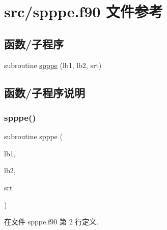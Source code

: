 \hypertarget{spppe_8f90}{}\section{src/spppe.f90 文件参考}
\label{spppe_8f90}
\subsection*{函数/子程序}
\begin{DoxyCompactItemize}
\item 
subroutine \mbox{\hyperlink{spppe_8f90_a9cb6f6a63b7a1a2ae6aa07af2f4e24ac}{spppe}} (lb1, lb2, srt)
\end{DoxyCompactItemize}


\subsection{函数/子程序说明}
\mbox{\label{spppe_8f90_a9cb6f6a63b7a1a2ae6aa07af2f4e24ac}} 
\subsubsection{\texorpdfstring{spppe()}{spppe()}}
{\footnotesize\ttfamily subroutine spppe (\begin{DoxyParamCaption}\item[{}]{lb1,  }\item[{}]{lb2,  }\item[{}]{srt }\end{DoxyParamCaption})}



在文件 spppe.\+f90 第 2 行定义.

